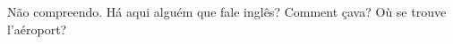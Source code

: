 \documentclass{article}
\begin{document}
Não compreendo. Há aqui alguém que fale inglês?
Comment çava? Où se trouve l'aéroport?
\end{document}

